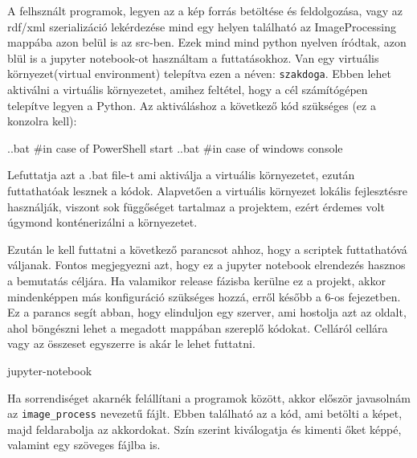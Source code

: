 
A felhsznált programok, legyen az a kép forrás betöltése és feldolgozása, vagy az rdf/xml szerializáció lekérdezése mind egy helyen található az ImageProcessing mappába azon belül is az src-ben. Ezek mind mind python nyelven íródtak, azon blül is a jupyter notebook-ot használtam a futtatásokhoz. Van egy virtuális környezet(virtual environment) telepítva ezen a néven: \texttt{szakdoga}. Ebben lehet aktiválni a virtuális környezetet, amihez feltétel, hogy a cél számítógépen telepítve legyen a Python. Az aktiváláshoz a következő kód szükséges (ez a konzolra kell):
\begin{python}
	.\szakdoga\Scripts\activate.bat #in case of PowerShell
	start .\szakdoga\Scripts\activate.bat #in case of windows console
\end{python}
Lefuttatja azt a .bat file-t ami aktiválja a virtuális környezetet, ezután futtathatóak lesznek a kódok. Alapvetően a virtuális környezet  lokális fejlesztésre használják, viszont sok függőséget tartalmaz a projektem, ezért érdemes volt úgymond konténerizálni a környezetet.
\par
Ezután le kell futtatni a következő parancsot ahhoz, hogy a scriptek futtathatóvá váljanak. Fontos megjegyezni azt, hogy ez a jupyter notebook elrendezés hasznos a bemutatás céljára. Ha valamikor release fázisba kerülne ez a projekt, akkor mindenképpen más konfiguráció szükséges hozzá, erről később a 6-os fejezetben. Ez a parancs segít abban, hogy elinduljon egy szerver, ami hostolja azt az oldalt, ahol böngészni lehet a megadott mappában szereplő kódokat. Celláról cellára vagy az összeset egyszerre is akár le lehet futtatni.
\begin{python}
	jupyter-notebook
\end{python}
\par
Ha sorrendiséget akarnék felállítani a programok között, akkor először javasolnám az \texttt{image\_process} nevezetű fájlt. Ebben található az a kód, ami betölti a képet, majd feldarabolja az akkordokat. Szín szerint kiválogatja és kimenti őket képpé, valamint egy szöveges fájlba is.